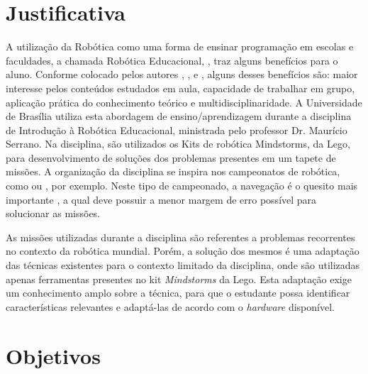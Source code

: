 	
	

	
\section{Justificativa}

	A utilização da Robótica como uma forma de ensinar programação em escolas e faculdades, a chamada Robótica Educacional, \cite{roboticaEducacionalAulasMatematica}, traz alguns benefícios para o aluno. Conforme colocado pelos autores \cite{teachingWithRoboticKit}, \cite{roboticEducationBasedLego}, \cite{roboticaEducacionalAulasMatematica} e \cite{evaluationRoboticEducationScale}, alguns desses benefícios são: maior interesse pelos conteúdos estudados em aula, capacidade de trabalhar em grupo, aplicação prática do conhecimento teórico e multidisciplinaridade. A Universidade de Brasília utiliza esta abordagem de ensino/aprendizagem durante a disciplina de Introdução à Robótica Educacional, ministrada pelo professor Dr. Maurício Serrano. Na disciplina, são utilizados os Kits de robótica Mindstorms, da Lego, para desenvolvimento de soluções dos problemas presentes em um tapete de missões. A organização da disciplina se inspira nos campeonatos de robótica, como \cite{ciber-rato} ou \cite{roboBulldozerIV}, por exemplo. Neste tipo de campeonado, a navegação é o quesito mais importante \cite{ciber-rato}, a qual deve possuir a menor margem de erro possível para solucionar as missões.

	As missões utilizadas durante a disciplina são referentes a problemas recorrentes no contexto da robótica mundial. Porém, a solução dos mesmos é uma adaptação das técnicas existentes para o contexto limitado da disciplina, onde são utilizadas apenas ferramentas presentes no kit \textit{Mindstorms} da Lego. Esta adaptação exige um conhecimento amplo sobre a técnica, para que o estudante possa identificar características relevantes e adaptá-las de acordo com o \textit{hardware} disponível.


	\section{Objetivos}


